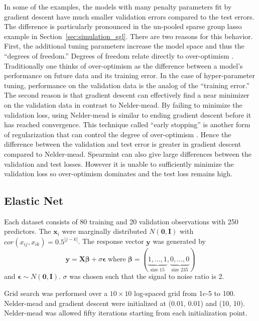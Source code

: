 \documentclass[12pt]{article}
\begin{document}
In some of the examples, the models with many penalty parameters fit by gradient descent have much smaller validation errors compared to the test errors. The difference is particularly pronounced in the un-pooled sparse group lasso example in Section~\ref{sec:simulation_sgl}. There are two reasons for this behavior. First, the additional tuning parameters increase the model space and thus the ``degrees of freedom.'' Degrees of freedom relate directly to over-optimism \citep{tibshirani2015degrees}. Traditionally one thinks of over-optimism as the difference between a model's performance on future data and its training error. In the case of hyper-parameter tuning, performance on the validation data is the analog of the ``training error.''
The second reason is that gradient descent can effectively find a near minimizer on the validation data in contrast to Nelder-mead. By failing to minimize the validation loss, using Nelder-mead is similar to ending gradient descent before it has reached convergence. This technique called ``early stopping'' is another form of regularization that can control the degree of over-optimism \citep{yao2007early}. Hence the difference between the validation and test error is greater in gradient descent compared to Nelder-mead. 
Spearmint can also give large differences between the validation and test losses. However it is unable to sufficiently minimize the validation loss so over-optimism dominates and the test loss remains high.

\subsection{Elastic Net}
Each dataset consists of 80 training and 20 validation observations with 250 predictors. The $\boldsymbol x_i$ were marginally distributed $N(\boldsymbol 0,\boldsymbol I)$ with $cor(x_{ij},x_{ik}) = 0.5^{|j-k|}$.
The response vector $\boldsymbol y$ was generated by
\begin{equation}
\boldsymbol y = \boldsymbol X \boldsymbol \beta + \sigma \boldsymbol \epsilon \; \text{where} \; \boldsymbol \beta = (\underbrace{1, ..., 1}_\text{size 15}, \underbrace{0, ..., 0}_\text{size 235})
\end{equation}
and $\boldsymbol \epsilon \sim N(\boldsymbol 0, \boldsymbol I)$. $\sigma$ was chosen such that the signal to noise ratio is 2. 

Grid search was performed over a $10 \times 10$ log-spaced grid from 1$e$-5 to 100. Nelder-mead and gradient descent were initialized at (0.01, 0.01) and (10, 10). Nelder-mead was allowed fifty iterations starting from each initialization point.
\end{document}
